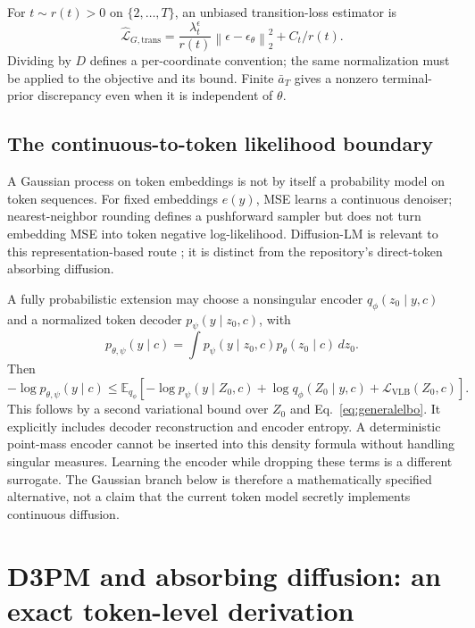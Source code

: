 \documentclass{article}
\theoremstyle{remark}\newtheorem{remark}[theorem]{Remark}
\newcommand{\E}{\mathbb E}
\newcommand{\norm}[1]{\left\lVert #1\right\rVert}
\begin{document}
For $t\sim r(t)>0$ on $\{2,\ldots,T\}$, an unbiased transition-loss estimator is
\begin{equation}
 \widehat{\mathcal L}_{G,\mathrm{trans}}
 =\frac{\lambda_t^\epsilon}{r(t)}\norm{\epsilon-\epsilon_\theta}_2^2+C_t/r(t).
\end{equation}
Dividing by $D$ defines a per-coordinate convention; the same normalization must be applied to the objective and its bound. Finite $\bar a_T$ gives a nonzero terminal-prior discrepancy even when it is independent of $\theta$.

\subsection{The continuous-to-token likelihood boundary}
A Gaussian process on token embeddings is not by itself a probability model on token sequences. For fixed embeddings $e(y)$, MSE learns a continuous denoiser; nearest-neighbor rounding defines a pushforward sampler but does not turn embedding MSE into token negative log-likelihood. Diffusion-LM is relevant to this representation-based route \cite{diffusionlm}; it is distinct from the repository's direct-token absorbing diffusion.

A fully probabilistic extension may choose a nonsingular encoder $q_\phi(z_0\mid y,c)$ and a normalized token decoder $p_\psi(y\mid z_0,c)$, with
\begin{equation}
 p_{\theta,\psi}(y\mid c)=\int p_\psi(y\mid z_0,c)p_\theta(z_0\mid c)\,dz_0.
\end{equation}
Then
\begin{equation}
 -\log p_{\theta,\psi}(y\mid c)
 \le\E_{q_\phi}\!\left[-\log p_\psi(y\mid Z_0,c)+\log q_\phi(Z_0\mid y,c)
 +\mathcal L_{\mathrm{VLB}}(Z_0,c)\right].
 \label{eq:embeddingelbo}
\end{equation}
This follows by a second variational bound over $Z_0$ and Eq.~\eqref{eq:generalelbo}. It explicitly includes decoder reconstruction and encoder entropy. A deterministic point-mass encoder cannot be inserted into this density formula without handling singular measures. Learning the encoder while dropping these terms is a different surrogate. The Gaussian branch below is therefore a mathematically specified alternative, not a claim that the current token model secretly implements continuous diffusion.

\section{D3PM and absorbing diffusion: an exact token-level derivation}
\label{sec:d3pm}
\end{document}
